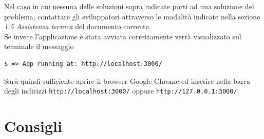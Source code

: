 \noindent Nel caso in cui nessuna delle soluzioni sopra indicate porti ad una soluzione del problema, contattare gli sviluppatori attraverso le modalità indicate nella sezione \emph{1.5 Assistenza tecnica} del documento corrente.\\

Se invece l'applicazione è stata avviata correttamente verrà visualizzato sul terminale il messaggio 

\begin{lstlisting}[style=DOS]
	$ => App running at: http://localhost:3000/
\end{lstlisting}

Sarà quindi sufficiente aprire il browser Google Chrome ed inserire nella barra degli indirizzi \verb+http://localhost:3000/+ oppure \verb+http://127.0.0.1:3000/+.

\section{Consigli}